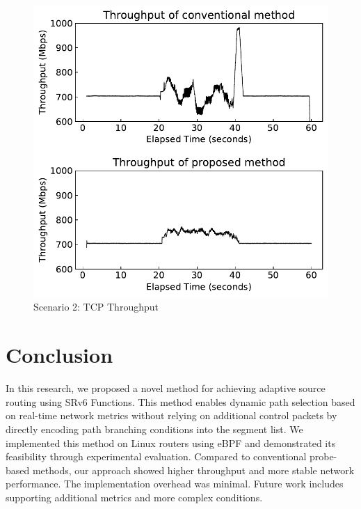 \documentclass[conference]{IEEEtran}
\begin{document}
\begin{figure}[t]
  \centering
  \includegraphics[width=0.7\linewidth]{./figures/scenario-2.pdf}
  \caption{Scenario 2: TCP Throughput}
  \label{fig:scenario-2}
\end{figure}

\section{Conclusion}

In this research, we proposed a novel method for achieving adaptive source routing using SRv6 Functions.
This method enables dynamic path selection based on real-time network metrics without relying on additional control packets by directly encoding path branching conditions into the segment list.
We implemented this method on Linux routers using eBPF and demonstrated its feasibility through experimental evaluation.
Compared to conventional probe-based methods, our approach showed higher throughput and more stable network performance.
The implementation overhead was minimal.
Future work includes supporting additional metrics and more complex conditions.



\end{document}
